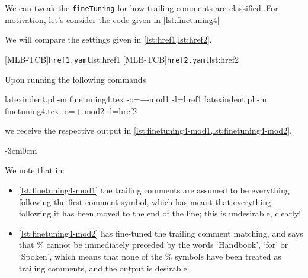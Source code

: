\documentclass[10pt]{article}
\newenvironment{widepage}{\begin{adjustwidth}{-3cm}{0cm}}{\end{adjustwidth}}
\begin{document}
 \begin{example}
 We can tweak the \texttt{fineTuning} for how trailing comments are classified. For
 motivation, let's consider the code given in \cref{lst:finetuning4}


 We will compare the settings given in \cref{lst:href1,lst:href2}.

 \begin{cmhtcbraster}[raster column skip=.01\linewidth,
   raster left skip=0cm,
   raster right skip=-0.5cm,]
  [MLB-TCB]{\texttt{href1.yaml}}{lst:href1}
  [MLB-TCB]{\texttt{href2.yaml}}{lst:href2}
 \end{cmhtcbraster}

 Upon running the following commands

 \begin{commandshell}
latexindent.pl -m finetuning4.tex -o=+-mod1 -l=href1
latexindent.pl -m finetuning4.tex -o=+-mod2 -l=href2
\end{commandshell}

 we receive the respective output in \cref{lst:finetuning4-mod1,lst:finetuning4-mod2}.

 \begin{widepage}

 \end{widepage}

 We note that in:
 \begin{itemize}
  \item \cref{lst:finetuning4-mod1} the trailing comments are assumed to be everything following
        the first comment symbol, which has meant that everything following it has been moved to
        the end of the line; this is undesirable, clearly!
  \item \cref{lst:finetuning4-mod2} has fine-tuned the trailing comment matching, and says that
        \% cannot
        be immediately preceded by the words `Handbook', `for' or `Spoken', which means that
        none of the \% symbols have been treated as trailing comments, and the output is
        desirable.
 \end{itemize}
 \end{example}
\end{document}
